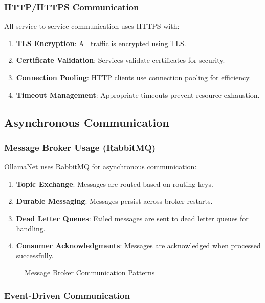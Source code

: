 \subsubsection{HTTP/HTTPS Communication}

All service-to-service communication uses HTTPS with:

\begin{enumerate}
   \item \textbf{TLS Encryption}: All traffic is encrypted using TLS.
   \item \textbf{Certificate Validation}: Services validate certificates for security.
   \item \textbf{Connection Pooling}: HTTP clients use connection pooling for efficiency.
   \item \textbf{Timeout Management}: Appropriate timeouts prevent resource exhaustion.
\end{enumerate}

\subsection{Asynchronous Communication}

\subsubsection{Message Broker Usage (RabbitMQ)}

OllamaNet uses RabbitMQ for asynchronous communication:

\begin{enumerate}
   \item \textbf{Topic Exchange}: Messages are routed based on routing keys.
   \item \textbf{Durable Messaging}: Messages persist across broker restarts.
   \item \textbf{Dead Letter Queues}: Failed messages are sent to dead letter queues for handling.
   \item \textbf{Consumer Acknowledgments}: Messages are acknowledged when processed successfully.
\end{enumerate}

\begin{figure}
    \centering
    \caption{Message Broker Communication Patterns}
    \label{fig:messaging-patterns}
\end{figure}

\subsubsection{Event-Driven Communication}

